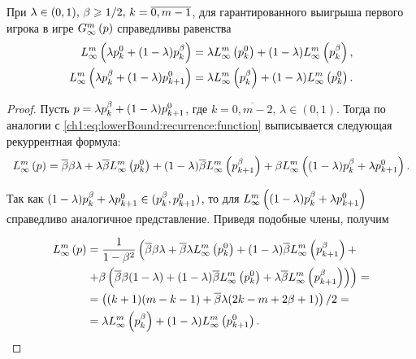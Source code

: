 {\begin{proposition}
  \label{ch1:prop:first:combination:game}
  При $\lambda \in (0, 1), \, \Co \geq 1/2, \, k = \overline{0, m-1}$, для гарантированного выигрыша первого игрока в игре $\infiniteGame{p}$ справедливы равенства
  \begin{align*}
    \lowerBound{\lambda \pEven + (1-\lambda) \pOdd}      
    &= 
      \lambda \lowerBound{\pEven} + (1-\lambda) \lowerBound{\pOdd}, \\
    \lowerBound{\lambda \pOdd + (1-\lambda) \pEven[k+1]} 
    &= \lambda \lowerBound{\pOdd} + (1-\lambda) \lowerBound{\pEven}.
  \end{align*}
\end{proposition}
\begin{proof}
  Пусть $p = \lambda \pOdd + (1-\lambda) \pEven[k+1]$, где $k = \overline{0, m - 2}, \, \lambda \in (0, 1)$.
  Тогда по аналогии с \eqref{ch1:eq:lowerBound:recurrence:function} выписывается следующая рекуррентная формула:
  \begin{equation*}
    \lowerBound{p} = \DCo \Co \lambda + \lambda \DCo
    \lowerBound{\pEven} + (1-\lambda) \DCo \lowerBound{\pOdd[k+1]} +
    \Co \lowerBound{(1-\lambda) \pOdd + \lambda \pEven[k+1]}.
  \end{equation*}
  
  Так как $(1-\lambda)\pOdd + \lambda \pEven[k+1] \in (\pOdd, \pEven[k+1])$, то для $\lowerBound{(1-\lambda)\pOdd + \lambda \pEven[k+1]}$ справедливо аналогичное представление.
  Приведя подобные члены, получим

  \begin{equation}
    \label{ch1:eq:first:combination:game:2}
    \begin{aligned}
      \lowerBound{p} 
      &= 
      \frac{1}{1-\Co^2}
      \left(
        \DCo\Co\lambda + 
        \DCo\lambda\lowerBound{\pEven} + 
        (1-\lambda)\DCo\lowerBound{\pOdd[k+1]} + 
      \right.\\
      &\left. 
        + \Co \left( 
          \DCo\Co(1-\lambda) +
          (1-\lambda)\DCo\lowerBound{\pEven} +
          \lambda\DCo\lowerBound{\pOdd[k+1]} 
        \right)
      \right) = \\
      &=
      \left( (k + 1)(m - k - 1) + \DCo\lambda(2k - m + 2\Co + 1)
      \right)/2 = \\
      &=
      \lambda\lowerBound{\pOdd} + (1-\lambda)\lowerBound{\pEven[k+1]}.
    \end{aligned}
  \end{equation}
  

\end{proof}}
